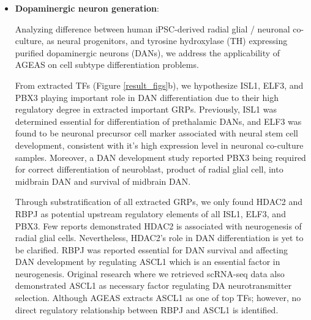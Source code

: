 \documentclass[fleqn,10pt]{wlscirep}
\begin{document}
  \begin{itemize}
      \setlength\itemsep{0em}
      \item {\textbf{Dopaminergic neuron generation}}:

        Analyzing difference between human iPSC-derived radial glial / neuronal co-culture, as neural progenitors,\cite{ASCL1_dopaminergic_neuron_2021} and tyrosine hydroxylase (TH) expressing purified dopaminergic neurons (DANs), we address the applicability of AGEAS on cell subtype differentiation problems.

        From extracted TFs (Figure \ref{result_figs}b), we hypothesize ISL1, ELF3, and PBX3 playing important role in DAN differentiation due to their high regulatory degree in extracted important GRPs.
        Previously, ISL1 was determined essential for differentiation of prethalamic DANs, \cite{isl1_da} and ELF3 was found to be neuronal precursor cell marker associated with neural stem cell development, \cite{ELF3_precursor_marker} consistent with it's high expression level in neuronal co-culture samples.
        Moreover, a DAN development study reported PBX3 being required for correct differentiation of neuroblast, product of radial glial cell, into midbrain DAN and survival of midbrain DAN. \cite{pbx3_dan}

        Through substratification of all extracted GRPs, we only found HDAC2 and RBPJ as potential upstream regulatory elements of all ISL1, ELF3, and PBX3.
        Few reports demonstrated HDAC2 is associated with neurogenesis of radial glial cells. \cite{hdac2_dan_1, hdac2_dan_2}
        Nevertheless, HDAC2's role in DAN differentiation is yet to be clarified.
        RBPJ was reported essential for DAN survival and affecting DAN development by regulating ASCL1 which is an essential factor in neurogenesis. \cite{rbpj_1, rbpj_2}
        Original research where we retrieved scRNA-seq data also demonstrated ASCL1 as necessary factor regulating DA neurotransmitter selection. \cite{ASCL1_dopaminergic_neuron_2021}
        Although AGEAS extracts ASCL1 as one of top TFs; however, no direct regulatory relationship between RBPJ and ASCL1 is identified.


\end{itemize}
\end{document}
